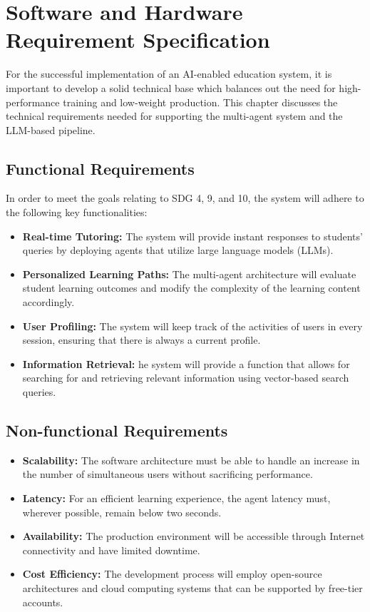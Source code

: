 \chapter{Software and Hardware Requirement Specification}
For the successful implementation of an AI-enabled education system, it is important to develop a solid technical base which balances out the need for high-performance training and low-weight production. This chapter discusses the technical requirements needed for supporting the multi-agent system and the LLM-based pipeline.

\section{Functional Requirements}
In order to meet the goals relating to SDG 4, 9, and 10, the system will adhere to the following key functionalities:
\begin{itemize}
	\item \textbf{Real-time Tutoring:} The system will provide instant responses to students' queries by deploying agents that utilize large language models (LLMs).
	\item \textbf{Personalized Learning Paths:} The multi-agent architecture will evaluate student learning outcomes and modify the complexity of the learning content accordingly.
	\item \textbf{User Profiling:} The system will keep track of the activities of users in every session, ensuring that there is always a current profile. 
	\item \textbf{Information Retrieval:} he system will provide a function that allows for searching for and retrieving relevant information using vector-based search queries.
\end{itemize}

\section{Non-functional Requirements}
\begin{itemize}
	\item \textbf{Scalability:} The software architecture must be able to handle an increase in the number of simultaneous users without sacrificing performance.
	\item \textbf{Latency:} For an efficient learning experience, the agent latency must, wherever possible, remain below two seconds.
	\item \textbf{Availability:} The production environment will be accessible through Internet connectivity and have limited downtime.
	\item \textbf{Cost Efficiency:} The development process will employ open-source architectures and cloud computing systems that can be supported by free-tier accounts.
\end{itemize}

